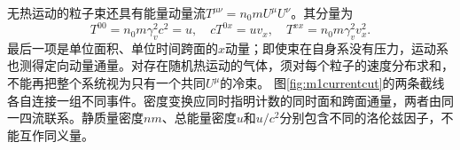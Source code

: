 无热运动的粒子束还具有能量动量流$T^{\mu\nu}=n_0mU^\mu U^\nu$。其分量为
\[
 T^{00}=n_0m\gamma_v^2c^2=u,\quad
 cT^{0x}=uv_x,\quad T^{xx}=n_0m\gamma_v^2v_x^2.
\]
最后一项是单位面积、单位时间跨面的$x$动量；即使束在自身系没有压力，运动系也测得定向动量通量。对存在随机热运动的气体，须对每个粒子的速度分布求和，不能再把整个系统视为只有一个共同$U^\mu$的冷束。
图\ref{fig:m1currentcut}的两条截线各自连接一组不同事件。密度变换应同时指明计数的同时面和跨面通量，两者由同一四流联系。静质量密度$n m$、总能量密度$u$和$u/c^2$分别包含不同的洛伦兹因子，不能互作同义量。
